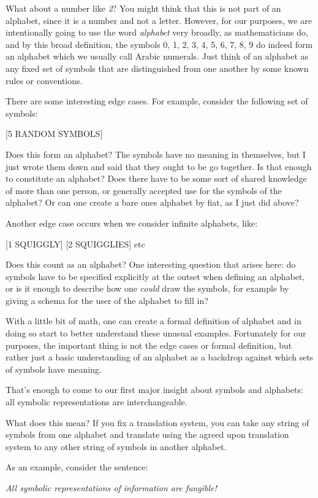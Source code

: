 \documentclass{book}
\begin{document}
What about a number like \emph{2}? You might think that this is not part of an alphabet, since it is a number and not a letter. However, for our purposes, we are intentionally going to use the word \emph{alphabet} very broadly, as mathematicians do, and by this broad definition, the symbols 0, 1, 2, 3, 4, 5, 6, 7, 8, 9 do indeed form an alphabet which we usually call Arabic numerals. Just think of an alphabet as any fixed set of symbols that are distinguished from one another by some known rules or conventions.

There are some interesting edge cases. For example, consider the following set of symbols:

[5 RANDOM SYMBOLS]

Does this form an alphabet? The symbols have no meaning in themselves, but I just wrote them down and said that they ought to be go together. Is that enough to constitute an alphabet? Does there have to be some sort of shared knowledge of more than one person, or generally accepted use for the symbols of the alphabet? Or can one create a bare ones alphabet by fiat, as I just did above?

Another edge case occurs when we consider infinite alphabets, like:

[1 SQUIGGLY] [2 SQUIGGLIES] etc

Does this count as an alphabet? One interesting question that arises here: do symbols have to be specified explicitly at the outset when defining an alphabet, or is it enough to describe how one \emph{could} draw the symbols, for example by giving a schema for the user of the alphabet to fill in?

With a little bit of math, one can create a formal definition of alphabet and in doing so start to better understand these unusual examples. Fortunately for our purposes, the important thing is not the edge cases or formal definition, but rather just a basic understanding of an alphabet as a backdrop against which sets of symbols have meaning.

That's enough to come to our first major insight about symbols and alphabets: all symbolic representations are interchangeable.

What does this mean? If you fix a translation system, you can take any string of symbols from one alphabet and translate using the agreed upon translation system to any other string of symbols in another alphabet.

As an example, consider the sentence:

  \emph{All symbolic representations of information are fungible!}
\end{document}
